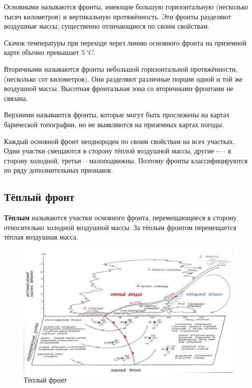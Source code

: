 \documentclass[a4paper, 12pt, twoside, final, book, russian, fittopage, cyremdash, openright]{ncc}
\newcommand{\grC}{\ensuremath{\,^\circ{}C}\xspace}
\begin{document}
Основными называются фронты, имеющие большую горизонтальную
(несколько тысяч километров) и вертикальную протяжённость. Эти фронты
разделяют воздушные массы, существенно отличающиеся по своим
свойствам.

Скачок температуры при переходе через линию основного фронта на
приземной карте обычно превышает 5\grC.

Вторичными называются фронты небольшой горизонтальной протяжённости,
(несколько сот километров).  Они разделяют различные порции одной и
той же воздушной массы. Высотная фронтальная зона со вторичными
фронтами не связана.

Верхними называются фронты, которые могут быть прослежены на картах
барической топографии, но не выявляются на приземных картах погоды.

Каждый основной фронт неоднороден по своим свойствам на всех
участках. Одни участки смещаются в сторону тёплой воздушной массы,
другие \--— в сторону холодной, третьи \--- малоподвижны. Поэтому фронты
классифицируются по ряду дополнительных признаков.

\subsection{Тёплый фронт}
\label{sec:warm_front}

\textbf{Тёплым} называются участки основного фронта, перемещающиеся в сторону
относительно холодной воздушной массы. За тёплым фронтом перемещается
тёплая воздушная масса.

\begin{figure}[htb]
   \centering
   \includegraphics[scale=0.7]{06_warm_front.pdf}
   \caption{Тёплый фронт}
   \label{fig:06_warm_front}
\end{figure}
\end{document}
